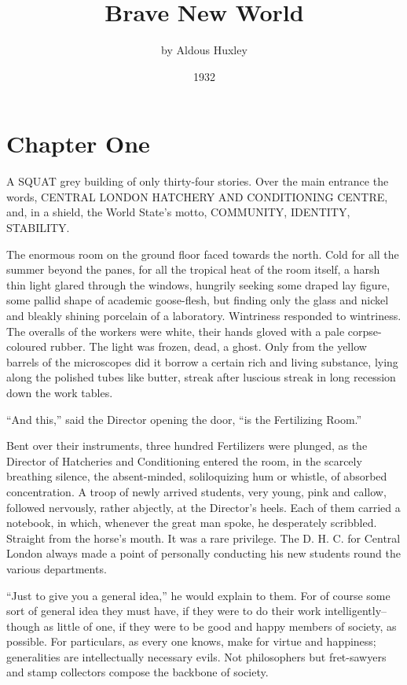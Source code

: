 \documentclass[12pt]{report}
\title{\HUGE\bfseries{Brave New World}}
\author{\Large by Aldous Huxley}
\date{\vspace{-4mm}1932}
\newcommand{\mychapter}[2]{
\setcounter{chapter}{#1}
    \setcounter{section}{0}
    \chapter*{#2}
    \addcontentsline{toc}{chapter}{#2}
}
\begin{document}
\begin{titlepage}
    \maketitle
\end{titlepage}


\titlespacing{\chapter}{0mm}{-2em}{2em}
\mychapter{1}{Chapter One}
A SQUAT grey building of only thirty-four stories. Over the main
entrance the words, {\selectfont CENTRAL LONDON HATCHERY AND CONDITIONING CENTRE,}
and, in a shield, the World State's motto, {\selectfont COMMUNITY, IDENTITY,
STABILITY.}

The enormous room on the ground floor faced towards the north. Cold for
all the summer beyond the panes, for all the tropical heat of the room
itself, a harsh thin light glared through the windows, hungrily seeking
some draped lay figure, some pallid shape of academic goose-flesh, but
finding only the glass and nickel and bleakly shining porcelain of a
laboratory. Wintriness responded to wintriness. The overalls of the
workers were white, their hands gloved with a pale corpse-coloured
rubber. The light was frozen, dead, a ghost. Only from the yellow
barrels of the microscopes did it borrow a certain rich and living
substance, lying along the polished tubes like butter, streak after
luscious streak in long recession down the work tables.

``And this,'' said the Director opening the door, ``is the Fertilizing
Room.''

Bent over their instruments, three hundred Fertilizers were plunged, as
the Director of Hatcheries and Conditioning entered the room, in the
scarcely breathing silence, the absent-minded, soliloquizing hum or
whistle, of absorbed concentration. A troop of newly arrived students,
very young, pink and callow, followed nervously, rather abjectly, at the
Director's heels. Each of them carried a notebook, in which, whenever
the great man spoke, he desperately scribbled. Straight from the horse's
mouth. It was a rare privilege. The D. H. C. for Central London always
made a point of personally conducting his new students round the various
departments.

``Just to give you a general idea,'' he would explain to them. For of
course some sort of general idea they must have, if they were to do
their work intelligently--though as little of one, if they were to be
good and happy members of society, as possible. For particulars, as
every one knows, make for virtue and happiness; generalities are
intellectually necessary evils. Not philosophers but fret-sawyers and
stamp collectors compose the backbone of society.
\end{document}

